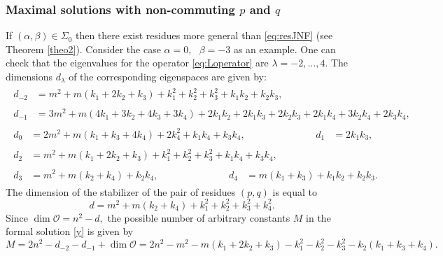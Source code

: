 \documentclass{article}
\theoremstyle{plain}
\begin{document}
\subsubsection{Maximal solutions with non-commuting \texorpdfstring{$p$}{p} and \texorpdfstring{$q$}{q}}\label{sec213}

If $(\alpha, \beta)\in \Sigma_0$ then there exist residues more general than \eqref{eq:resJNF} (see Theorem \ref{theo2}). Consider the case $\alpha=0$, \, $\beta=-3$ as an example. One can check that the eigenvalues for the operator   \eqref{eq:Loperator} are $\lambda=-2,\dots, 4$. The dimensions $d_{\lambda}$ of the corresponding eigenspaces are given by:
\begin{gather*}
    \begin{aligned}
    d_{-2}
    &= m^2 + m ( k_1 + 2 k_2 + k_3 ) + k_1^2 + k_2^2 + k_3^2 + k_1 k_2 + k_2 k_3,
    \end{aligned}
    \\[2mm]
    \begin{aligned}
    d_{-1}
    &= 3 m^2 + m (4 k_1 + 3 k_2 + 4 k_3 + 3 k_4)
    + 2 k_1 k_2 + 2 k_1 k_3 + 2 k_2 k_3 + 2 k_1 k_4 + 3 k_2 k_4 + 2 k_3 k_4,
    \end{aligned}
    \\[2mm]
    \begin{aligned}
    d_{0}
    &= 2 m^2 + m (k_1 + k_3 + 4 k_4) + 2 k_4^2 + k_1 k_4 + k_3 k_4,
    &&&&&&&&&
    d_{1}
    &= 2 k_1 k_3,
    \end{aligned}
    \\[2mm]
    \begin{aligned}
    d_2
    &= m^2 + m (k_1 + 2 k_2 + k_3)
    + k_1^2 + k_2^2 + k_3^2 + k_1 k_4 + k_3 k_4,
    \end{aligned}
    \\[2mm]
    \begin{aligned}
    d_3
    &= m^2 + m (k_2 + k_4) + k_2 k_4,
    &&&&&&&&&
    d_4 
    &= m (k_1 + k_3) + k_1 k_2 + k_2 k_3.
    \end{aligned}
\end{gather*}
The dimension of the stabilizer of the pair of residues $(p,q)$ is equal to
\begin{equation*}
    d 
    = m^2 + m (k_2 + k_4) + k_1^2 + k_2^2 + k_3^2 + k_4^2.
\end{equation*}
Since $\dim \mathcal{O} = n^2-d,$  the possible number of arbitrary constants $M$ in the formal solution  \eqref{y} is given by 
\begin{equation}\label{0,-3}
    M
    = 2 n^2 - d_{-2} - d_{-1} + \dim \mathcal{O}
    = 2 n^2 - m^2 - m (k_1 + 2 k_2 + k_3) - k_1^2 - k_2^2 - k_3^2 - k_2 (k_1 + k_3 + k_4).
\end{equation}
\end{document}
